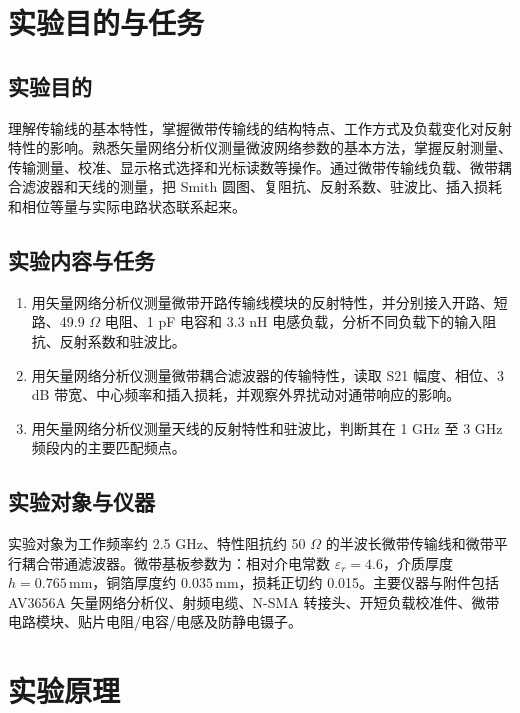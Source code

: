 \documentclass{ctexart}
\begin{document}
\makecover
\makecoveri
\zdx



\section{实验目的与任务}

\subsection{实验目的}

理解传输线的基本特性，掌握微带传输线的结构特点、工作方式及负载变化对反射特性的影响。熟悉矢量网络分析仪测量微波网络参数的基本方法，掌握反射测量、传输测量、校准、显示格式选择和光标读数等操作。通过微带传输线负载、微带耦合滤波器和天线的测量，把 Smith 圆图、复阻抗、反射系数、驻波比、插入损耗和相位等量与实际电路状态联系起来。

\subsection{实验内容与任务}

\begin{enumerate}
  \item 用矢量网络分析仪测量微带开路传输线模块的反射特性，并分别接入开路、短路、49.9 $\Omega$ 电阻、1 pF 电容和 3.3 nH 电感负载，分析不同负载下的输入阻抗、反射系数和驻波比。
  \item 用矢量网络分析仪测量微带耦合滤波器的传输特性，读取 S21 幅度、相位、3 dB 带宽、中心频率和插入损耗，并观察外界扰动对通带响应的影响。
  \item 用矢量网络分析仪测量天线的反射特性和驻波比，判断其在 1 GHz 至 3 GHz 频段内的主要匹配频点。
\end{enumerate}

\subsection{实验对象与仪器}

实验对象为工作频率约 2.5 GHz、特性阻抗约 50 $\Omega$ 的半波长微带传输线和微带平行耦合带通滤波器。微带基板参数为：相对介电常数 $\varepsilon_r=4.6$，介质厚度 $h=0.765\,\mathrm{mm}$，铜箔厚度约 $0.035\,\mathrm{mm}$，损耗正切约 0.015。主要仪器与附件包括 AV3656A 矢量网络分析仪、射频电缆、N-SMA 转接头、开短负载校准件、微带电路模块、贴片电阻/电容/电感及防静电镊子。

\section{实验原理}
\end{document}
